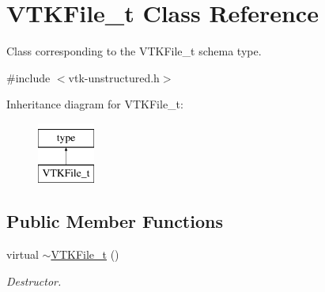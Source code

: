 \hypertarget{classVTKFile__t}{}\section{V\+T\+K\+File\+\_\+t Class Reference}
\label{classVTKFile__t}


Class corresponding to the V\+T\+K\+File\+\_\+t schema type.  




{\ttfamily \#include $<$vtk-\/unstructured.\+h$>$}

Inheritance diagram for V\+T\+K\+File\+\_\+t\+:\begin{figure}[H]
\begin{center}
\leavevmode
\includegraphics[height=2.000000cm]{classVTKFile__t}
\end{center}
\end{figure}
\subsection*{Public Member Functions}
\begin{DoxyCompactItemize}
\item 
virtual \hyperlink{classVTKFile__t_ac5cf95c81660088dbb3c9ab6cd78dede}{$\sim$\+V\+T\+K\+File\+\_\+t} ()
\begin{DoxyCompactList}\small\item\em Destructor. \end{DoxyCompactList}\end{DoxyCompactItemize}
